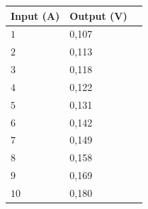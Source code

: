\begin{table}[H]
\begin{tabular}{|l|l|l|}
\hline%
  \textbf{Input (A)}  & \textbf{Output (V)}  \\
\hline%
  $1$                 &            0,107    \\
\hline%
  $2$                 &            0,113    \\
\hline%
  $3$                 &            0,118    \\
\hline%
  $4$                 &            0,122    \\
\hline%
  $5$                 &            0,131    \\
\hline%
  $6$                 &            0,142    \\
\hline%
  $7$                 &            0,149    \\
\hline%
  $8$                 &            0,158    \\
\hline%
  $9$                 &            0,169    \\
\hline%
  $10$                &            0,180    \\
\hline%
\end{tabular}
\end{table}

